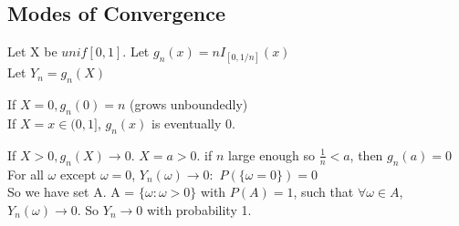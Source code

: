 \subsection*{Modes of Convergence}
Let X be $unif[0,1]$. Let $g_n(x) = nI_{[0, 1/n]}(x) $\\
Let $Y_n = g_n(X)$
\begin{center}
	If $X = 0, g_n(0) = n$ \quad (grows unboundedly)\\
	If $X = x \in (0, 1]$, $g_n(x)$ is eventually 0.
\end{center}
If $X > 0, g_n(X) \rightarrow 0$. $X = a > 0$. if $n$ large enough so $\frac{1}{n} < a$, then $g_n(a) = 0$\\
For all $\omega$ except $\omega = 0$, $Y_n(\omega) \rightarrow 0:$ $P(\{ \omega = 0 \}) = 0$\\
So we have set A. A = $\{\omega : \omega > 0 \}$ with $P(A) = 1$, such that $\forall \omega \in A$, $Y_n(\omega) \rightarrow 0$. So $Y_n \rightarrow 0$ with probability 1. 